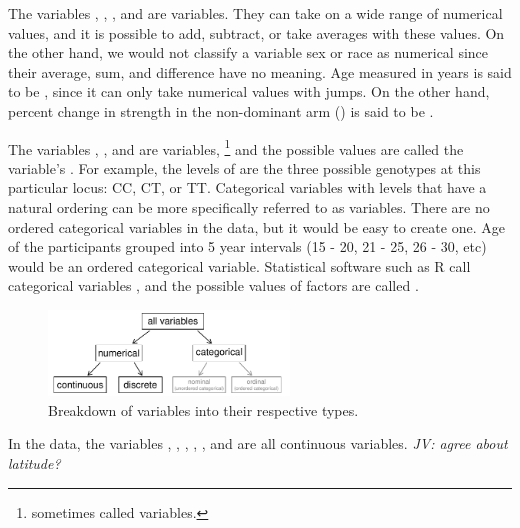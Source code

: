 \begin{doublespace}

The variables , , , and  are  variables. They can take on a wide range of numerical values, and it is possible to add, subtract, or take averages with these values. On the other hand, we would not classify a variable sex or race  as numerical since their average, sum, and difference have no meaning. Age measured in years is said to be , since it can only take numerical values with jumps. On the other hand, percent change in strength in the non-dominant arm () is said to be .

The variables , , and  are  variables, \footnote{sometimes called  variables.} and the possible values are called the variable's . For example, the levels of  are the three possible genotypes at this particular locus: CC, CT, or TT. Categorical variables with levels that have a natural ordering can be more specifically referred to as  variables. There are no ordered categorical variables in the  data, but it would be easy to create one.  Age of the participants grouped into 5 year intervals (15 - 20, 21 - 25, 26 - 30, etc) would be an ordered categorical variable.  Statistical software such as \textsf{R} call categorical variables , and the possible values of factors are called .


\begin{figure}
\centering
\includegraphics[width=0.57\textwidth]{ch_intro_to_data_oi_biostat/figures/variables/variables}
\caption{Breakdown of variables into their respective types.}
\label{variables}
\end{figure}

In the  data, the variables , , , , , and  are all continuous variables.  \textit{JV: agree about latitude?}



\end{doublespace}
